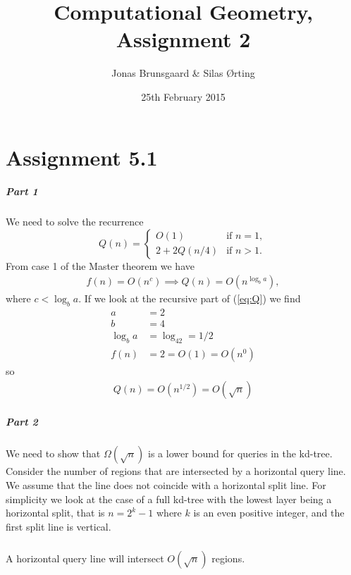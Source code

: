 \documentclass[10pt,a4paper,final,oneside,openany,article]{memoir}
\title{Computational Geometry, Assignment 2}
\author{
    Jonas Brunsgaard \& Silas Ørting
}
\date{25th February 2015}
\newcommand{\twopartdef}[4] {
  \left\{
    \begin{array}{ll}
      #1 & \mbox{if } #2 \\
      {#3} & \mbox{if } #4
    \end{array}
  \right.
}
\begin{document}
\maketitle

\chapter*{Assignment 5.1}

\paragraph{Part 1}
We need to solve the recurrence
\begin{equation}
  \label{eq:Q}
  Q(n) = \twopartdef{O(1)}{n = 1,}{2 + 2Q(n/4)}{n > 1.}
\end{equation}
From case 1 of the Master theorem we have
\begin{align*}
  f(n) = O(n^c) \implies Q(n) = O(n^{\log_ba}),
\end{align*}
where $c < \log_ba$. If we look at the recursive part of (\ref{eq:Q}) we find
\begin{align*}
  a &= 2\\
  b &= 4\\
  \log_ba &= \log_42 = 1/2\\
  f(n) &= 2 = O(1) = O(n^0)
\end{align*}
so 
\begin{align*}
  Q(n) = O(n^{1/2}) = O(\sqrt{n})
\end{align*}

\paragraph{Part 2}
We need to show that $\Omega(\sqrt{n})$ is a lower bound for queries in the kd-tree. Consider the number of regions that are intersected by a horizontal query line. We assume that the line does not coincide with a horizontal split line. For simplicity we look at the case of a full kd-tree with the lowest layer being a horizontal split, that is $n = 2^k - 1$ where $k$ is an even positive integer, and the first split line is vertical.

\paragraph{}
A horizontal query line will intersect $O(\sqrt{n})$ regions. 
\end{document}
